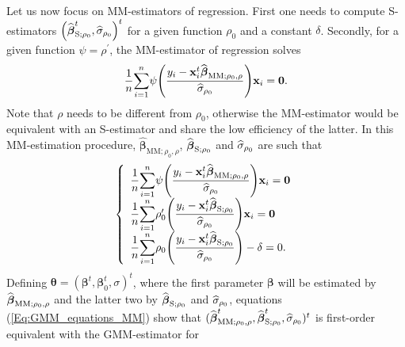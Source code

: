 Let us now focus on MM-estimators of regression. First one needs to compute
S-estimators $\left(  \sthat{\boldsymbol\beta}_{\mathrm{S};\rho_{0}}%
^{t},\sthat{\sigma}_{\rho_{0}}\right)  ^{t}$ for a given function $\rho_{0}$
and a constant $\delta$. Secondly, for a given function $\psi=\rho^{\prime}$,
the MM-estimator of regression solves
\[
\dfrac{1}{n}%
{\displaystyle\sum\limits_{i=1}^{n}}
\psi\left(  \dfrac{y_{i}-\stvec{x}_{i}^{t}\sthat{\boldsymbol\beta%
}_{\mathrm{MM};\rho_{0},\rho}}{\sthat{\sigma}_{\rho_{0}}}\right)
\stvec{x}_{i}=\mathbf{0}.
\]
Note that $\rho$ needs to be different from $\rho_{0}$, otherwise the
MM-estimator would be equivalent with an S-estimator and share the low
efficiency of the latter. In this MM-estimation procedure, $\widehat
{\boldsymbol\beta}_{\mathrm{MM};\rho_{0},\rho}$, $\widehat{\boldsymbol{\beta
}}_{\mathrm{S};\rho_{0}}$ and $\widehat{\sigma}_{\rho_{0}}$ are such that
\begin{equation}
\left\{
\begin{array}
[c]{l}%
\dfrac{1}{n}%
{\displaystyle\sum\limits_{i=1}^{n}}
\psi\left(  \dfrac{y_{i}-\stvec{x}_{i}^{t}\sthat{\boldsymbol\beta%
}_{\mathrm{MM};\rho_{0},\rho}}{\sthat{\sigma}_{\rho_{0}}}\right)
\stvec{x}_{i}=\mathbf{0}\\
\dfrac{1}{n}%
{\displaystyle\sum\limits_{i=1}^{n}}
\rho_{0}^{\prime}\left(  \dfrac{y_{i}-\stvec{x}_{i}^{t}\widehat
{\boldsymbol\beta}_{\mathrm{S};\rho_{0}}}{\sthat{\sigma}_{\rho_{0}}%
}\right)  \stvec{x}_{i}=\mathbf{0}\\
\dfrac{1}{n}%
{\displaystyle\sum\limits_{i=1}^{n}}
\rho_{0}\left(  \dfrac{y_{i}-\stvec{x}_{i}^{t}\sthat{\boldsymbol\beta%
}_{\mathrm{S};\rho_{0}}}{\sthat{\sigma}_{\rho_{0}}}\right)  -\delta=0.
\end{array}
\right.  \label{Eq:GMM_equations_MM}%
\end{equation}
Defining $\boldsymbol{\theta}=(\boldsymbol\beta^{t},\boldsymbol\beta%
_{0}^{t},\sigma)^{t}$, where the first parameter $\boldsymbol\beta$ will be
estimated by $\widehat{\boldsymbol\beta}_{\mathrm{MM};\rho_{0},\rho}$ and
the latter two by $\widehat{\boldsymbol\beta}_{\mathrm{S};\rho_{0}}$ and
$\widehat{\sigma}_{\rho_{0}}$, equations (\ref{Eq:GMM_equations_MM}) show that
$(\sthat{\boldsymbol\beta}_{\mathrm{MM};\rho_{0},\rho}^{t},\widehat
{\boldsymbol\beta}_{\mathrm{S};\rho_{0}}^{t},\sthat{\sigma}_{\rho_{0}%
})^{t}$ is first-order equivalent with the GMM-estimator for
